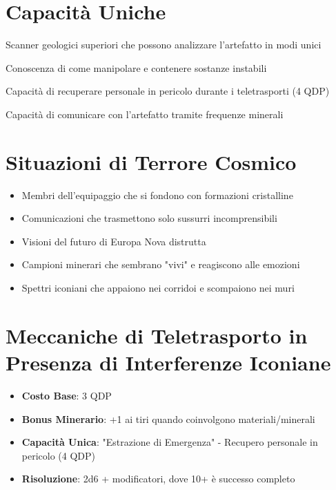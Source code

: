 \documentclass[11pt,a4paper]{article}
\begin{document}
\section{Capacità Uniche}

\begin{tcolorbox}[colback=mininglightorange!10, colframe=miningorange]
\begin{description}[leftmargin=*]
\item[Sistemi estrattivi avanzati] Scanner geologici superiori che possono analizzare l'artefatto in modi unici
\item[Esperienza con materiali esotici] Conoscenza di come manipolare e contenere sostanze instabili
\item[Estrazione di Emergenza] Capacità di recuperare personale in pericolo durante i teletrasporti (4 QDP)
\item[Traduttore Minerale] Capacità di comunicare con l'artefatto tramite frequenze minerali
\end{description}
\end{tcolorbox}

\section{Situazioni di Terrore Cosmico}

\begin{tcolorbox}[colback=mininglightorange!10, colframe=miningorange]
\begin{itemize}[leftmargin=*]
\item Membri dell'equipaggio che si fondono con formazioni cristalline
\item Comunicazioni che trasmettono solo sussurri incomprensibili
\item Visioni del futuro di Europa Nova distrutta
\item Campioni minerari che sembrano "vivi" e reagiscono alle emozioni
\item Spettri iconiani che appaiono nei corridoi e scompaiono nei muri
\end{itemize}
\end{tcolorbox}

\section{Meccaniche di Teletrasporto in Presenza di Interferenze Iconiane}

\begin{tcolorbox}[colback=mininglightorange!10, colframe=miningorange]
\begin{itemize}[leftmargin=*]
\item \textbf{Costo Base}: 3 QDP
\item \textbf{Bonus Minerario}: +1 ai tiri quando coinvolgono materiali/minerali
\item \textbf{Capacità Unica}: "Estrazione di Emergenza" - Recupero personale in pericolo (4 QDP)
\item \textbf{Risoluzione}: 2d6 + modificatori, dove 10+ è successo completo
\end{itemize}
\end{tcolorbox}
\end{document}
